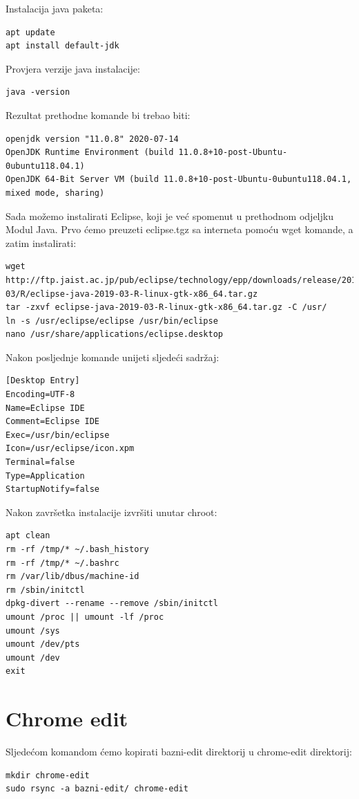 \documentclass[12pt,vi]{mitthesis}
\begin{document}
\noindent
Instalacija java paketa:
\begin{lstlisting}[style=BashInputStyle]
apt update
apt install default-jdk
\end{lstlisting}
Provjera verzije java instalacije:
\begin{lstlisting}[style=BashInputStyle]
java -version
\end{lstlisting}
Rezultat prethodne komande bi trebao biti:
\begin{lstlisting}[style=BashInputStyle]
openjdk version "11.0.8" 2020-07-14
OpenJDK Runtime Environment (build 11.0.8+10-post-Ubuntu-0ubuntu118.04.1)
OpenJDK 64-Bit Server VM (build 11.0.8+10-post-Ubuntu-0ubuntu118.04.1, mixed mode, sharing)
\end{lstlisting}
Sada možemo instalirati Eclipse, koji je već spomenut u prethodnom odjeljku Modul Java. Prvo ćemo preuzeti eclipse.tgz sa interneta pomoću wget komande, a zatim instalirati:
\begin{lstlisting}[style=BashInputStyle]
wget http://ftp.jaist.ac.jp/pub/eclipse/technology/epp/downloads/release/2019-03/R/eclipse-java-2019-03-R-linux-gtk-x86_64.tar.gz
tar -zxvf eclipse-java-2019-03-R-linux-gtk-x86_64.tar.gz -C /usr/
ln -s /usr/eclipse/eclipse /usr/bin/eclipse
nano /usr/share/applications/eclipse.desktop
\end{lstlisting}
Nakon posljednje komande unijeti sljedeći sadržaj:
\begin{lstlisting}[style=BashInputStyle]
[Desktop Entry]
Encoding=UTF-8
Name=Eclipse IDE
Comment=Eclipse IDE
Exec=/usr/bin/eclipse
Icon=/usr/eclipse/icon.xpm
Terminal=false
Type=Application
StartupNotify=false
\end{lstlisting}

\noindent
Nakon završetka instalacije izvršiti unutar chroot:
\begin{lstlisting}[style=BashInputStyle]
apt clean
rm -rf /tmp/* ~/.bash_history
rm -rf /tmp/* ~/.bashrc
rm /var/lib/dbus/machine-id
rm /sbin/initctl
dpkg-divert --rename --remove /sbin/initctl
umount /proc || umount -lf /proc
umount /sys
umount /dev/pts
umount /dev
exit
\end{lstlisting}

\section*{Chrome edit}

\indent
Sljedećom komandom ćemo kopirati bazni-edit direktorij u chrome-edit direktorij:
\begin{lstlisting}[style=BashInputStyle]
mkdir chrome-edit
sudo rsync -a bazni-edit/ chrome-edit
\end{lstlisting}
\end{document}
